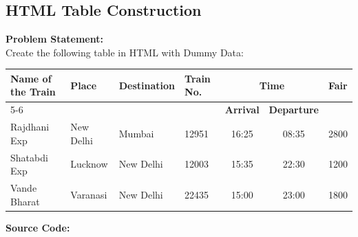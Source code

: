 \documentclass[a4paper,12pt]{article}
\begin{document}
\subsection{HTML Table Construction}

\textbf{Problem Statement:} \\
Create the following table in HTML with Dummy Data:

\begin{center}
\begin{tabular}{|l|l|l|l|c|c|l|}
\hline
\multirow{2}{*}{\textbf{Name of the Train}} & \multirow{2}{*}{\textbf{Place}} & \multirow{2}{*}{\textbf{Destination}} & \multirow{2}{*}{\textbf{Train No.}} & \multicolumn{2}{c|}{\textbf{Time}} & \multirow{2}{*}{\textbf{Fair}} \\ 
\cline{5-6}
 & & & & \textbf{Arrival} & \textbf{Departure} & \\ 
\hline
Rajdhani Exp & New Delhi & Mumbai & 12951 & 16:25 & 08:35 & 2800 \\ \hline
Shatabdi Exp & Lucknow & New Delhi & 12003 & 15:35 & 22:30 & 1200 \\ \hline
Vande Bharat & Varanasi & New Delhi & 22435 & 15:00 & 23:00 & 1800 \\ \hline
\end{tabular}
\end{center}

\vspace{3cm}
\textbf{Source Code:}
\end{document}
